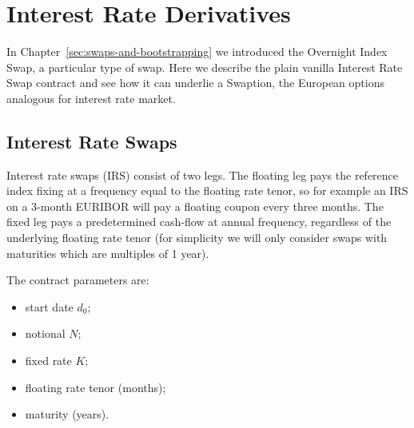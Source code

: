 \chapter{Interest Rate Derivatives}
\label{interest-rate-swaps-and-swaptions}

In Chapter~\ref{sec:swaps-and-bootstrapping} we introduced the Overnight Index Swap, a particular type of swap. Here we describe the plain vanilla Interest Rate Swap contract and see how it can underlie a Swaption, the European options analogous for interest rate market.

\section{Interest Rate Swaps}\label{interest-rate-swaps}

Interest rate swaps (IRS) consist of two legs. The floating leg pays the reference index fixing at a frequency equal to the floating rate tenor, so for example an IRS on a 3-month EURIBOR will pay a floating coupon every three months.
The fixed leg pays a predetermined cash-flow at annual frequency, regardless of the underlying floating rate tenor (for simplicity we will only consider swaps with maturities which are multiples of 1 year).

The contract parameters are:

\begin{itemize}
\tightlist
\item start date $d_0$;
\item notional $N$;
\item fixed rate $K$;
\item floating rate tenor (months);
\item maturity (years).
\end{itemize}

